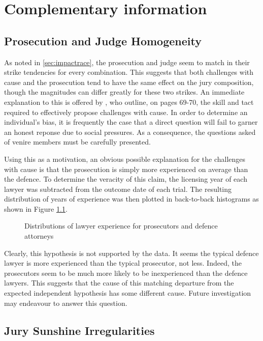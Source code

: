 \chapter{Complementary information}
\label{app:complement}

\section{Prosecution and Judge Homogeneity} \label{sec:causepro}

As noted in \ref{sec:impactrace}, the prosecution and judge seem to match in their strike tendencies for every combination. This
suggests that both challenges with cause and the prosecution tend to have the same effect on the jury composition, though the
magnitudes can differ greatly for these two strikes. An immediate explanation to this is offered by \cite{hansvidjudging}, who
outline, on pages 69-70, the skill and tact required to effectively propose challenges with cause. In order to determine an
individual's bias, it is frequently the case that a direct question will fail to garner an honest reponse due to social pressures.
As a consequence, the questions asked of venire members must be carefully presented.

Using this as a motivation, an obvious possible explanation for the challenges with cause is that the prosecution is simply more
experienced on average than the defence. To determine the veracity of this claim, the licensing year of each lawyer was subtracted
from the outcome date of each trial. The resulting distribution of years of experience was then plotted in back-to-back histograms
as shown in Figure \ref{fig:lawyerexp}.

\begin{figure}[h!]
  \caption[Lawyer Experience (Sunshine)]
  {\footnotesize Distributions of lawyer experience for prosecutors and defence attorneys}
  \label{fig:lawyerexp}
\end{figure}

Clearly, this hypothesis is not supported by the data. It seems the typical defence lawyer is more experienced than the typical
prosecutor, not less. Indeed, the prosecutors seem to be much more likely to be inexperienced than the defence lawyers. This
suggests that the cause of this matching departure from the expected independent hypothesis has some different cause. Future
investigation may endeavour to answer this question.

\section{Jury Sunshine Irregularities} \label{app:irregs}

